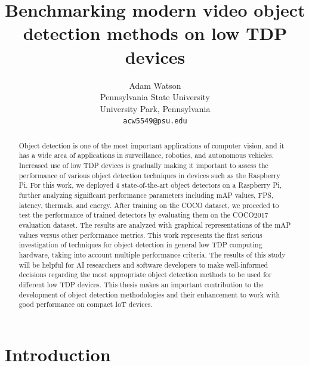 \documentclass[10pt,twocolumn,letterpaper]{article}
\begin{document}
\title{Benchmarking modern video object detection methods on low TDP devices}

\author{Adam Watson\\
Pennsylvania State University\\
University Park, Pennsylvania\\
{\tt\small acw5549@psu.edu}
}
\maketitle

\begin{abstract}
Object detection is one of the most important applications of computer vision, and it has a wide area of applications in surveillance, robotics, and autonomous vehicles.
Increased use of low TDP devices is gradually making it important to assess the performance of various object detection techniques in devices such as the Raspberry Pi.
For this work, we deployed 4 state-of-the-art object detectors on a Raspberry Pi, further analyzing significant performance parameters including mAP values, FPS, latency, thermals, and energy.
After training on the COCO dataset, we proceded to test the performance of trained detectors by evaluating them on the COCO2017 evaluation dataset.
The results are analyzed  with graphical representations of the mAP values versus other performance metrics.
This work represents the first serious investigation of techniques for object detection in general low TDP computing hardware, taking into account multiple performance criteria.
The results of this study will be helpful for AI researchers and software developers to make well-informed decisions regarding the most appropriate object detection methods to be used for different low TDP devices.
This thesis makes an important contribution to the development of object detection methodologies and their enhancement to work with good performance on compact IoT devices.
\end{abstract}

\section{Introduction}
\label{sec:intro}
\end{document}
